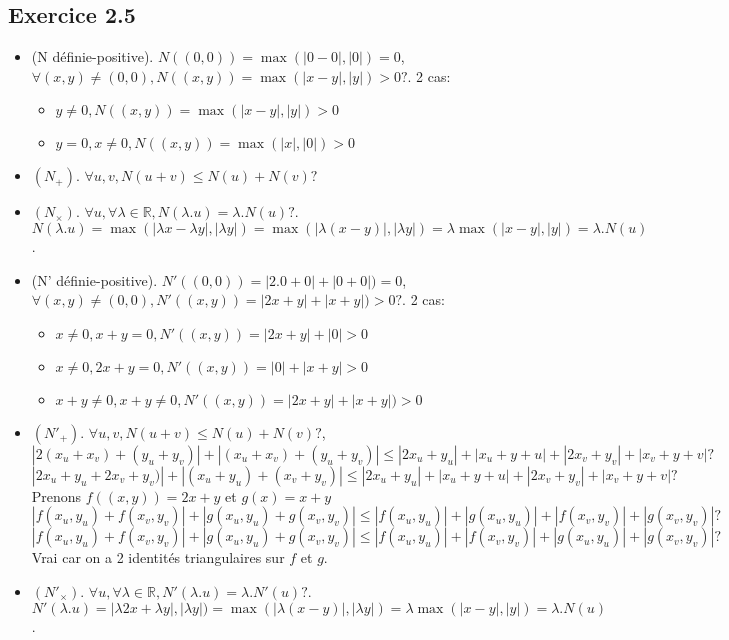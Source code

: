 \documentclass[]{book}
\theoremstyle{definition}
\newcommand{\bb}[1]{\mathbb{#1}}
\newcommand{\R}{\bb{R}}
\begin{document}
\subsection*{Exercice 2.5}
\begin{itemize}
\item (N d\'efinie-positive). $N((0,0)) = \max(|0-0|,|0|) = 0$, $\forall (x,y) \neq (0,0), N((x,y)) = \max(|x-y|,|y|) >0 ?$. 2 cas:
\begin{itemize}
\item $y \neq 0, N((x,y)) = \max(|x-y|,|y|) >0$
\item $y= 0, x \neq 0, N((x,y)) = \max(|x|,|0|) >0$
\end{itemize}
\item $(N_+)$. $\forall u,v, N(u+v) \leq N(u) + N(v)?$
\item $(N_{\times})$. $\forall u, \forall \lambda \in \R, N(\lambda.u) = \lambda.N(u)?$. $N(\lambda.u) = \max(|\lambda x-\lambda y|,|\lambda y|) = \max(|\lambda (x-y)|,|\lambda y|) = \lambda \max(|x-y|,|y|) = \lambda.N(u)$.
\end{itemize}


\begin{itemize}
\item (N' d\'efinie-positive). $N'((0,0)) = |2.0+0|+|0+0|) = 0$, $\forall (x,y) \neq (0,0), N'((x,y)) = |2x+y|+|x+y|) >0 ?$. 2 cas:
\begin{itemize}
\item $x \neq 0, x+y=0, N'((x,y)) = |2x+y|+|0| > 0$
\item $x \neq 0, 2x+y=0, N'((x,y)) = |0|+|x+y| > 0$
\item $ x+y \neq 0, x+y \neq 0, N'((x,y)) = |2x+y|+|x+y|) >0$
\end{itemize}
\item $(N'_+)$. $\forall u,v, N(u+v) \leq N(u) + N(v)?$, 
$$|2(x_u + x_v) + (y_u + y_v)| + |(x_u+x_v)+(y_u+y_v)| \leq |2x_u+y_u| + |x_u+y+u|+|2x_v+y_v| + |x_v+y+v|?$$
$$|2x_u + y_u + 2x_v + y_v)| + |(x_u+y_u)+ (x_v+y_v)| \leq |2x_u+y_u| + |x_u+y+u|+|2x_v+y_v| + |x_v+y+v|?$$
Prenons $f((x,y)) = 2x+y$ et $g(x) = x+y$ 
$$ |f(x_u,y_u) + f(x_v,y_v)| + |g(x_u,y_u)+ g(x_v,y_v)| \leq |f(x_u,y_u)| + |g(x_u,y_u)|+|f(x_v,y_v)| + |g(x_v,y_v)|?$$
$$ |f(x_u,y_u) + f(x_v,y_v)| + |g(x_u,y_u)+ g(x_v,y_v)| \leq |f(x_u,y_u)| +|f(x_v,y_v)| + |g(x_u,y_u)|+ |g(x_v,y_v)|?$$
Vrai car on a 2 identit\'es triangulaires sur $f$ et $g$.
\item $(N'_{\times})$. $\forall u, \forall \lambda \in \R, N'(\lambda.u) = \lambda.N'(u)?$. $N'(\lambda.u) = |\lambda 2x+
\lambda y|,|\lambda y|) = \max(|\lambda (x-y)|,|\lambda y|) = \lambda \max(|x-y|,|y|) = \lambda.N(u)$.
\end{itemize}
\end{document}
